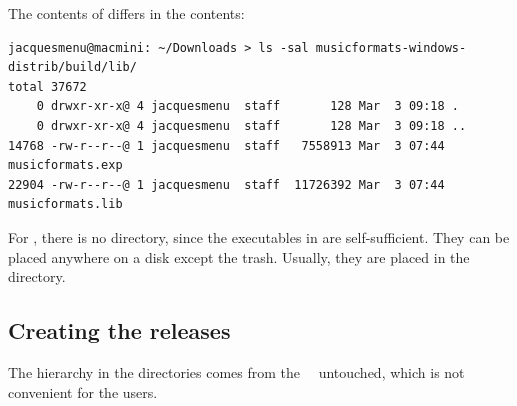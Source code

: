 The contents of  differs in the  contents:
\begin{lstlisting}[language=Terminal]
jacquesmenu@macmini: ~/Downloads > ls -sal musicformats-windows-distrib/build/lib/
total 37672
    0 drwxr-xr-x@ 4 jacquesmenu  staff       128 Mar  3 09:18 .
    0 drwxr-xr-x@ 4 jacquesmenu  staff       128 Mar  3 09:18 ..
14768 -rw-r--r--@ 1 jacquesmenu  staff   7558913 Mar  3 07:44 musicformats.exp
22904 -rw-r--r--@ 1 jacquesmenu  staff  11726392 Mar  3 07:44 musicformats.lib
\end{lstlisting}

For \MacOS, there is no  directory, since the executables in  are self-sufficient. They can be placed anywhere on a disk except the trash. Usually, they are placed in the  directory.



\subsection{Creating the releases}

The hierarchy in the  directories comes from the \mf\ \repo\ untouched, which is not convenient for the users.

